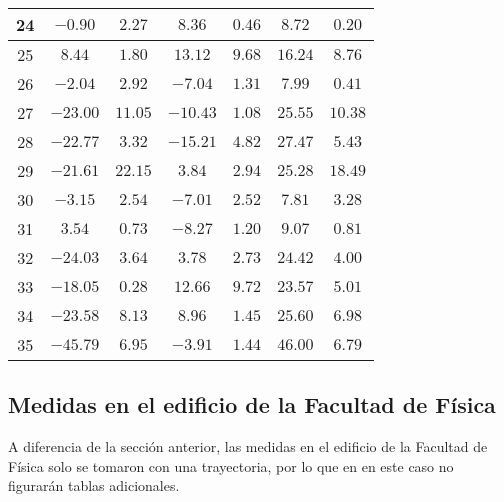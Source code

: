 \begin{table}[H]
\begin{tabular}{|c|c|c|c|c|c|c|}
                        24  &   $-0.90$    &  $2.27$   &  $8.36$    &   $0.46$   &  $8.72$   &  $0.20$  \\ \hline
                        25  &   $8.44$     &  $1.80$   &  $13.12$   &   $9.68$   &  $16.24$  &  $8.76$  \\ \hline
                        26  &   $-2.04$    &  $2.92$   &  $-7.04$   &   $1.31$   &  $7.99$   &  $0.41$  \\ \hline
                        27  &   $-23.00$   &  $11.05$  &  $-10.43$  &   $1.08$   &  $25.55$  &  $10.38$ \\ \hline
                        28  &   $-22.77$   &  $3.32$   &  $-15.21$  &   $4.82$   &  $27.47$  &  $5.43$  \\ \hline
                        29  &   $-21.61$   &  $22.15$  &  $3.84$    &   $2.94$   &  $25.28$  &  $18.49$ \\ \hline
                        30  &   $-3.15$    &  $2.54$   &  $-7.01$   &   $2.52$   &  $7.81$   &  $3.28$  \\ \hline
                        31  &   $3.54$     &  $0.73$   &  $-8.27$   &   $1.20$   &  $9.07$   &  $0.81$  \\ \hline
                        32  &   $-24.03$   &  $3.64$   &  $3.78$    &   $2.73$   &  $24.42$  &  $4.00$  \\ \hline
                        33  &   $-18.05$   &  $0.28$   &  $12.66$   &   $9.72$   &  $23.57$  &  $5.01$  \\ \hline
                        34  &   $-23.58$   &  $8.13$   &  $8.96$    &   $1.45$   &  $25.60$  &  $6.98$  \\ \hline
                        35  &   $-45.79$   &  $6.95$   &  $-3.91$   &   $1.44$   &  $46.00$  &  $6.79$  \\ \hline
        \end{tabular}
    \label{tab:media_lab_6_espiral}
\end{table}

\newpage
\subsection{Medidas en el edificio de la Facultad de Física}
A diferencia de la sección anterior, las medidas en el edificio de la Facultad de Física solo se tomaron con una trayectoria, por lo que en en este caso no figurarán tablas adicionales.

